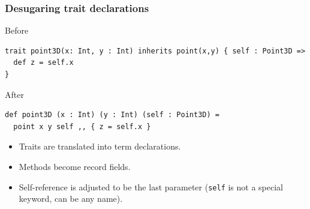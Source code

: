 \documentclass{beamer}
\begin{document}
\begin{frame}[fragile]
  \frametitle{Desugaring trait declarations}

  \begin{exampleblock}{Before}
\begin{lstlisting}
trait point3D(x: Int, y : Int) inherits point(x,y) { self : Point3D =>
  def z = self.x
}
\end{lstlisting}
  \end{exampleblock}

  \begin{exampleblock}{After}
\begin{lstlisting}
def point3D (x : Int) (y : Int) (self : Point3D) =
  point x y self ,, { z = self.x }
\end{lstlisting}
  \end{exampleblock}

  \begin{itemize}
  \item Traits are translated into term declarations.
  \item Methods become record fields.
  \item Self-reference is adjusted to be the last parameter (\lstinline{self} is
    not a special keyword, can be any name).
  \end{itemize}

\end{frame}
\end{document}

